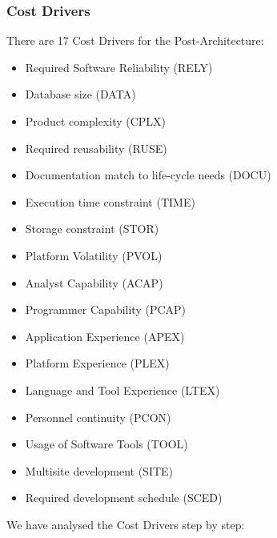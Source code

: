 \documentclass{article}
\begin{document}
	\subsubsection{Cost Drivers}
	There are 17 Cost Drivers for the Post-Architecture:
	\begin{itemize}
		\item Required Software Reliability (RELY)
		\item Database size (DATA)
		\item Product complexity (CPLX)
		\item Required reusability (RUSE)
		\item Documentation match to life-cycle needs (DOCU)
		\item Execution time constraint (TIME)
		\item Storage constraint (STOR)
		\item Platform Volatility (PVOL)
		\item Analyst Capability (ACAP)
		\item Programmer Capability (PCAP)
		\item Application Experience (APEX)
		\item Platform Experience (PLEX)
		\item Language and Tool Experience (LTEX)
		\item Personnel continuity (PCON)
		\item Usage of Software Tools (TOOL)
		\item Multisite development (SITE)
		\item Required development schedule (SCED)
	\end{itemize}
	\newpage
	
	We have analysed the Cost Drivers step by step:
	
\end{document}
